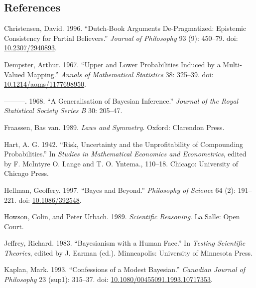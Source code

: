 \documentclass[
  10pt,
  letterpaper,
  DIV=11,
  numbers=noendperiod,
  twoside]{scrartcl}
\newlength{\cslhangindent}
\newenvironment{CSLReferences}[2] %
 {\begin{list}{}{%
  \setlength{\itemindent}{0pt}
  \setlength{\leftmargin}{0pt}
  \setlength{\parsep}{0pt}
  \ifodd #1
   \setlength{\leftmargin}{\cslhangindent}
   \setlength{\itemindent}{-1\cslhangindent}
  \fi
  \setlength{\itemsep}{#2\baselineskip}}}
 {\end{list}}
\begin{document}
\subsection*{References}\label{references}

\label{refs}
\begin{CSLReferences}{1}{0}
Christensen, David. 1996. {``Dutch-Book Arguments {D}e-Pragmatized:
Epistemic Consistency for Partial Believers.''} \emph{Journal of
Philosophy} 93 (9): 450--79. doi:
\href{https://doi.org/10.2307/2940893}{10.2307/2940893}.

Dempster, Arthur. 1967. {``Upper and Lower Probabilities Induced by a
Multi-Valued Mapping.''} \emph{Annals of Mathematical Statistics} 38:
325--39. doi:
\href{https://doi.org/10.1214/aoms/1177698950}{10.1214/aoms/1177698950}.

---------. 1968. {``A Generalisation of Bayesian Inference.''}
\emph{Journal of the Royal Statistical Society Series B} 30: 205--47.

Fraassen, Bas van. 1989. \emph{Laws and Symmetry}. Oxford: Clarendon
Press.

Hart, A. G. 1942. {``Risk, Uncertainty and the Unprofitability of
Compounding Probabilities.''} In \emph{Studies in Mathematical Economics
and Econometrics}, edited by F. McIntyre O. Lange and T. O. Yntema.,
110--18. Chicago: University of Chicago Press.

Hellman, Geoffery. 1997. {``Bayes and Beyond.''} \emph{Philosophy of
Science} 64 (2): 191--221. doi:
\href{https://doi.org/10.1086/392548}{10.1086/392548}.

Howson, Colin, and Peter Urbach. 1989. \emph{Scientific Reasoning}. La
Salle: Open Court.

Jeffrey, Richard. 1983. {``Bayesianism with a Human Face.''} In
\emph{Testing Scientific Theories}, edited by J. Earman (ed.).
Minneapolis: University of Minnesota Press.

Kaplan, Mark. 1993. {``Confessions of a Modest Bayesian.''}
\emph{Canadian Journal of Philosophy} 23 (sup1): 315--37. doi:
\href{https://doi.org/10.1080/00455091.1993.10717353}{10.1080/00455091.1993.10717353}.


\end{CSLReferences}
\end{document}
